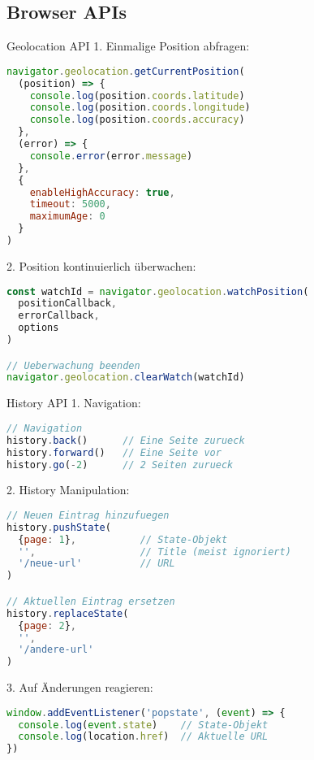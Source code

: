 \subsection{Browser APIs}

\begin{KR}{Geolocation API}
1. Einmalige Position abfragen:
\begin{lstlisting}[language=JavaScript, style=basesmol]
navigator.geolocation.getCurrentPosition(
  (position) => {
    console.log(position.coords.latitude)
    console.log(position.coords.longitude)
    console.log(position.coords.accuracy)
  },
  (error) => {
    console.error(error.message)
  },
  {
    enableHighAccuracy: true,
    timeout: 5000,
    maximumAge: 0
  }
)
\end{lstlisting}

2. Position kontinuierlich überwachen:
\begin{lstlisting}[language=JavaScript, style=basesmol]
const watchId = navigator.geolocation.watchPosition(
  positionCallback,
  errorCallback,
  options
)

// Ueberwachung beenden
navigator.geolocation.clearWatch(watchId)
\end{lstlisting}
\end{KR}

\begin{KR}{History API}
1. Navigation:
\begin{lstlisting}[language=JavaScript, style=basesmol]
// Navigation
history.back()      // Eine Seite zurueck
history.forward()   // Eine Seite vor
history.go(-2)      // 2 Seiten zurueck
\end{lstlisting}

2. History Manipulation:
\begin{lstlisting}[language=JavaScript, style=basesmol]
// Neuen Eintrag hinzufuegen
history.pushState(
  {page: 1},           // State-Objekt
  '',                  // Title (meist ignoriert)
  '/neue-url'          // URL
)

// Aktuellen Eintrag ersetzen
history.replaceState(
  {page: 2},
  '',
  '/andere-url'
)
\end{lstlisting}

3. Auf Änderungen reagieren:
\begin{lstlisting}[language=JavaScript, style=basesmol]
window.addEventListener('popstate', (event) => {
  console.log(event.state)    // State-Objekt
  console.log(location.href)  // Aktuelle URL
})
\end{lstlisting}
\end{KR}


